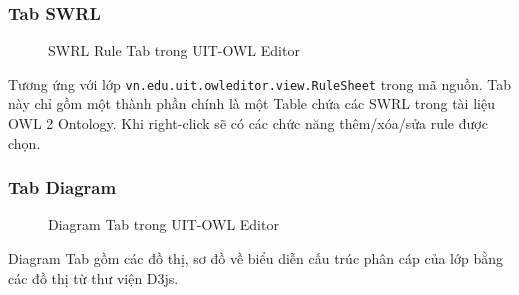 \subsubsection{Tab SWRL}
\begin{figure}[h!]
	\centering
	\caption{SWRL Rule Tab trong UIT-OWL Editor\label{overflow}}
\end{figure}
Tương ứng với lớp \verb|vn.edu.uit.owleditor.view.RuleSheet| trong mã nguồn. Tab này chỉ gồm một thành phần chính là một Table chứa các SWRL trong tài liệu OWL 2 Ontology. Khi right-click sẽ có các chức năng thêm/xóa/sửa rule được chọn.

\subsubsection{Tab Diagram}
\begin{figure}[h!]
	\centering
	\caption{Diagram Tab trong UIT-OWL Editor\label{overflow}}
\end{figure}
Diagram Tab gồm các đồ thị, sơ đồ về biểu diễn cấu trúc phân cáp của lớp bằng các đồ thị từ thư viện D3js.

